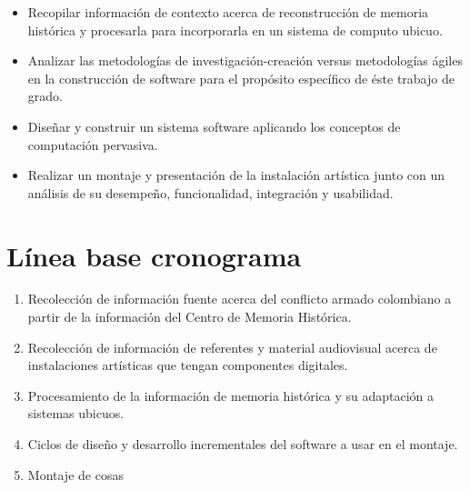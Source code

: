 \begin{itemize}

    \item Recopilar información de contexto acerca de reconstrucción de memoria histórica y procesarla para incorporarla en un sistema de computo ubicuo.
    
    \item Analizar las metodologías de investigación-creación versus metodologías ágiles en la construcción de software para el propósito específico de éste trabajo de grado.

    \item Diseñar y construir un sistema software aplicando los conceptos de computación pervasiva.

    \item Realizar un montaje y presentación de la instalación artística junto con un análisis de su desempeño, funcionalidad, integración y usabilidad.

\end{itemize}

\section{Línea base cronograma}

\begin{enumerate}
	\item \label{puntouno} Recolección de información fuente acerca del conflicto armado colombiano a partir de la información del Centro de Memoria Histórica.
	\item \label{puntodos} Recolección de información de referentes y material audiovisual acerca de instalaciones artísticas que tengan componentes digitales.
	\item \label{puntotres} Procesamiento de la información de memoria histórica y su adaptación a sistemas ubicuos.
	\item \label{puntocuatro} Ciclos de diseño y desarrollo incrementales del software a usar en el montaje.
	\item \label{puntocinco} Montaje de cosas
	
	
	
	
\end{enumerate}

